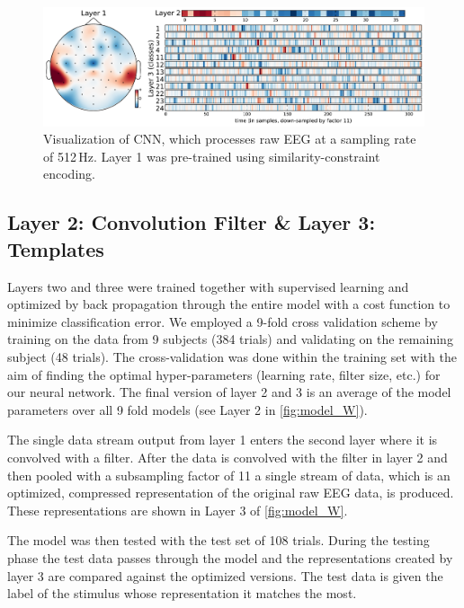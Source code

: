 \begin{figure}[h] 
  \begin{center}
    \includegraphics[width=\textwidth,keepaspectratio=true]{Figures/model_W}
    \caption{Visualization of \ac{CNN}, which processes raw EEG at a sampling rate of 512\,Hz.
    Layer 1 was pre-trained using similarity-constraint encoding.}
    \label{fig:model_W}
  \end{center}
\end{figure}

\subsection*{Layer 2: Convolution Filter \& Layer 3: Templates}
Layers two and three were trained together with supervised learning and optimized by back propagation through the entire model with a cost function to minimize classification error.
We employed a 9-fold cross validation scheme by training on the data from 9 subjects (384 trials) and validating on the remaining subject (48 trials).
The cross-validation was done within the training set with the aim of finding the optimal hyper-parameters (learning rate, filter size, etc.) for our neural network. 
The final version of layer 2 and 3 is an average of the model parameters over all 9 fold models (see Layer 2 in \autoref{fig:model_W}).

The single data stream output from layer 1 enters the second layer where it is convolved with a filter. 
After the data is convolved with the filter in layer 2 and then pooled with a subsampling factor of 11 a single stream of data, which is an optimized, compressed representation of the original raw EEG data, is produced.
These representations are shown in Layer 3 of \autoref{fig:model_W}. 

The model was then tested with the test set of 108 trials. 
During the testing phase the test data passes through the model and the representations created by layer 3 are compared against the optimized versions.
The test data is given the label of the stimulus whose representation it matches the most. 